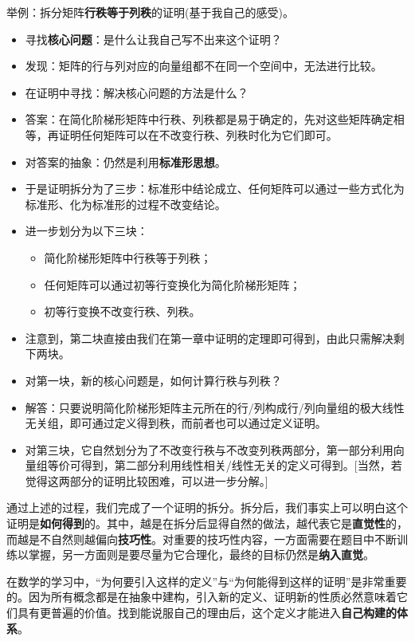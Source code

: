 \documentclass[a4paper,UTF8,fontset=windows]{ctexart}
\begin{document}
\begin{enumerate}
    举例：拆分矩阵\textbf{行秩等于列秩}的证明(基于我自己的感受)。
    \begin{itemize}
        \item 寻找\textbf{核心问题}：是什么让我自己写不出来这个证明？
        \item 发现：矩阵的行与列对应的向量组都不在同一个空间中，无法进行比较。
        \item 在证明中寻找：解决核心问题的方法是什么？
        \item 答案：在简化阶梯形矩阵中行秩、列秩都是易于确定的，先对这些矩阵确定相等，再证明任何矩阵可以在不改变行秩、列秩时化为它们即可。
        \item 对答案的抽象：仍然是利用\textbf{标准形思想}。
        \item 于是证明拆分为了三步：标准形中结论成立、任何矩阵可以通过一些方式化为标准形、化为标准形的过程不改变结论。
        \item 进一步划分为以下三块：
        \begin{itemize}
            \item 简化阶梯形矩阵中行秩等于列秩；
            \item 任何矩阵可以通过初等行变换化为简化阶梯形矩阵；
            \item 初等行变换不改变行秩、列秩。
        \end{itemize}
        \item 注意到，第二块直接由我们在第一章中证明的定理即可得到，由此只需解决剩下两块。
        \item 对第一块，新的核心问题是，如何计算行秩与列秩？
        \item 解答：只要说明简化阶梯形矩阵主元所在的行/列构成行/列向量组的极大线性无关组，即可通过定义得到秩，而前者也可以通过定义证明。
        \item 对第三块，它自然划分为了不改变行秩与不改变列秩两部分，第一部分利用向量组等价可得到，第二部分利用线性相关/线性无关的定义可得到。[当然，若觉得这两部分的证明比较困难，可以进一步分解。]
    \end{itemize}
    通过上述的过程，我们完成了一个证明的拆分。拆分后，我们事实上可以明白这个证明是\textbf{如何得到}的。其中，越是在拆分后显得自然的做法，越代表它是\textbf{直觉性}的，而越是不自然则越偏向\textbf{技巧性}。对重要的技巧性内容，一方面需要在题目中不断训练以掌握，另一方面则是要尽量为它合理化，最终的目标仍然是\textbf{纳入直觉}。

    在数学的学习中，``为何要引入这样的定义''与``为何能得到这样的证明''是非常重要的。因为所有概念都是在抽象中建构，引入新的定义、证明新的性质必然意味着它们具有更普遍的价值。找到能说服自己的理由后，这个定义才能进入\textbf{自己构建的体系}。


\end{enumerate}
\end{document}
